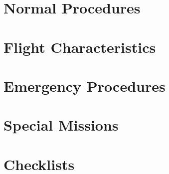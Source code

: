 \part{Normal Procedures}
\part{Flight Characteristics}
\part{Emergency Procedures}
\part{Special Missions}
\part{Checklists}
